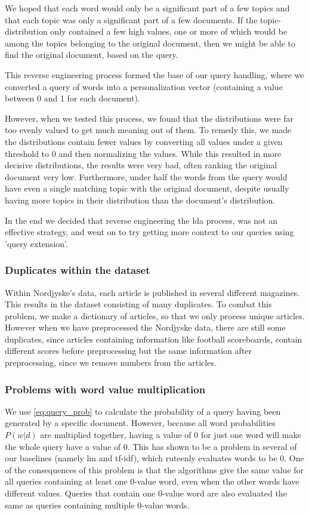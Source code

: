 We hoped that each word would only be a significant part of a few topics and that each topic was only a significant part of a few documents.
If the topic-distribution only contained a few high values, one or more of which would be among the topics belonging to the original document, then we might be able to find the original document, based on the query.

This reverse engineering process formed the base of our query handling, where we converted a query of words into a personalization vector (containing a value between 0 and 1 for each document).

However, when we tested this process, we found that the distributions were far too evenly valued to get much meaning out of them.
To remedy this, we made the distributions contain fewer values by converting all values under a given threshold to 0 and then normalizing the values.
While this resulted in more decisive distributions, the results were very bad, often ranking the original document very low.
Furthermore, under half the words from the query would have even a single matching topic with the original document, despite usually having more topics in their distribution than the document's distribution.
 
In the end we decided that reverse engineering the \gls{lda} process, was not an effective strategy, and went on to try getting more context to our queries using 'query extension'.


\subsubsection{Duplicates within the dataset}
Within Nordjyske's data, each article is published in several different magazines. 
This results in the dataset consisting of many duplicates. 
To combat this problem, we make a dictionary of articles, so that we only process unique articles.
However when we have preprocessed the Nordjyske data, there are still some duplicates, since articles containing information like football scoreboards, contain different scores before preprocessing but the same information after preprocessing, since we remove numbers from the articles.


\subsubsection{Problems with word value multiplication}
We use \autoref{eq:query_prob} to calculate the probability of a query having been generated by a specific document. 
However, because all word probabilities $P(w|d)$ are multiplied together, having a value of 0 for just one word will make the whole query have a value of 0.
This has shown to be a problem in several of our baselines (namely \gls{lm} and \gls{tf-idf}), which ruteenly evaluates words to be 0.
One of the consequences of this problem is that the algorithms give the same value for all queries containing at least one 0-value word, even when the other words have different values. 
Queries that contain one 0-value word are also evaluated the same as queries containing multiple 0-value words.

